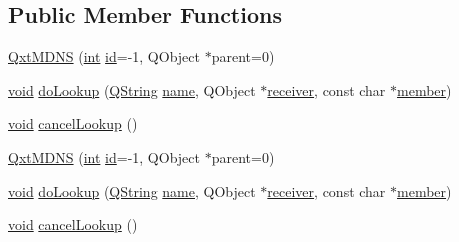 \subsection*{Public Member Functions}
\begin{DoxyCompactItemize}
\item 
\hyperlink{class_qxt_m_d_n_s_abc57516e01f4889fb4edc996e8e7e5dc}{Qxt\-M\-D\-N\-S} (\hyperlink{ioapi_8h_a787fa3cf048117ba7123753c1e74fcd6}{int} \hyperlink{glext_8h_a58c2a664503e14ffb8f21012aabff3e9}{id}=-\/1, Q\-Object $\ast$parent=0)
\item 
\hyperlink{group___u_a_v_objects_plugin_ga444cf2ff3f0ecbe028adce838d373f5c}{void} \hyperlink{class_qxt_m_d_n_s_a21b974a233120a8487c3da320ac64e3a}{do\-Lookup} (\hyperlink{group___u_a_v_objects_plugin_gab9d252f49c333c94a72f97ce3105a32d}{Q\-String} \hyperlink{glext_8h_ad977737dfc9a274a62741b9500c49a32}{name}, Q\-Object $\ast$\hyperlink{class_qxt_m_d_n_s_adabe8b750f25f9dfa3d9e052a62df927}{receiver}, const char $\ast$\hyperlink{class_qxt_m_d_n_s_a1f0da55979f7015f74686e51c8759a71}{member})
\item 
\hyperlink{group___u_a_v_objects_plugin_ga444cf2ff3f0ecbe028adce838d373f5c}{void} \hyperlink{class_qxt_m_d_n_s_a03221cc6e60150f316433b01d334a003}{cancel\-Lookup} ()
\item 
\hyperlink{class_qxt_m_d_n_s_abc57516e01f4889fb4edc996e8e7e5dc}{Qxt\-M\-D\-N\-S} (\hyperlink{ioapi_8h_a787fa3cf048117ba7123753c1e74fcd6}{int} \hyperlink{glext_8h_a58c2a664503e14ffb8f21012aabff3e9}{id}=-\/1, Q\-Object $\ast$parent=0)
\item 
\hyperlink{group___u_a_v_objects_plugin_ga444cf2ff3f0ecbe028adce838d373f5c}{void} \hyperlink{class_qxt_m_d_n_s_a21b974a233120a8487c3da320ac64e3a}{do\-Lookup} (\hyperlink{group___u_a_v_objects_plugin_gab9d252f49c333c94a72f97ce3105a32d}{Q\-String} \hyperlink{glext_8h_ad977737dfc9a274a62741b9500c49a32}{name}, Q\-Object $\ast$\hyperlink{class_qxt_m_d_n_s_adabe8b750f25f9dfa3d9e052a62df927}{receiver}, const char $\ast$\hyperlink{class_qxt_m_d_n_s_a1f0da55979f7015f74686e51c8759a71}{member})
\item 
\hyperlink{group___u_a_v_objects_plugin_ga444cf2ff3f0ecbe028adce838d373f5c}{void} \hyperlink{class_qxt_m_d_n_s_a03221cc6e60150f316433b01d334a003}{cancel\-Lookup} ()
\end{DoxyCompactItemize}
